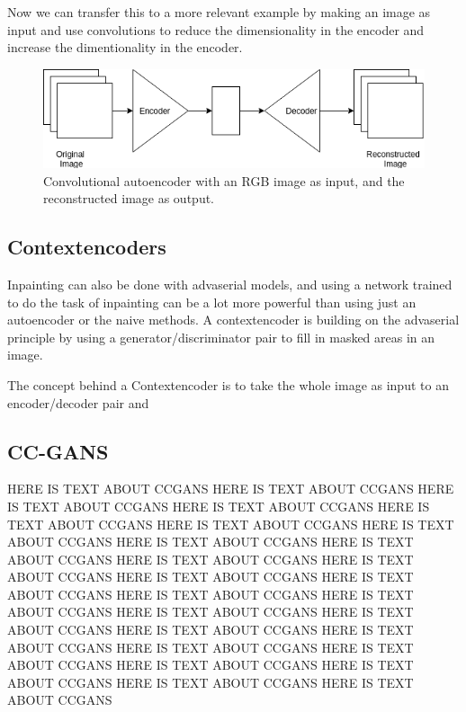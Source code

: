 	  Now we can transfer this to a more relevant example by making an image as input and use convolutions to reduce the dimensionality in the encoder and increase the dimentionality in the encoder.
	  \vspace{10px}
	  \begin{figure}[ht!]
	    \centering
	    \includegraphics[scale=0.5]{background/figures/CAE.png}
	    \caption{Convolutional autoencoder with an RGB image as input, and the reconstructed image as output.}
	  \end{figure}
	
    
    
    \subsection{Contextencoders}
	Inpainting can also be done with advaserial models, and using a network trained to do the task of inpainting can be a lot more powerful than using just an autoencoder or the naive methods.
	A contextencoder is building on the advaserial principle by using a generator/discriminator pair to fill in masked areas in an image. 
	
	The concept behind a Contextencoder is to take the whole image as input to an encoder/decoder pair and 
    
    
    \subsection{CC-GANS}
      HERE IS TEXT ABOUT CCGANS
      HERE IS TEXT ABOUT CCGANS
      HERE IS TEXT ABOUT CCGANS
      HERE IS TEXT ABOUT CCGANS
      HERE IS TEXT ABOUT CCGANS
      HERE IS TEXT ABOUT CCGANS
      HERE IS TEXT ABOUT CCGANS
      HERE IS TEXT ABOUT CCGANS
      HERE IS TEXT ABOUT CCGANS
      HERE IS TEXT ABOUT CCGANS
      HERE IS TEXT ABOUT CCGANS
      HERE IS TEXT ABOUT CCGANS
      HERE IS TEXT ABOUT CCGANS
      HERE IS TEXT ABOUT CCGANS
      HERE IS TEXT ABOUT CCGANS
      HERE IS TEXT ABOUT CCGANS
      HERE IS TEXT ABOUT CCGANS
      HERE IS TEXT ABOUT CCGANS
      HERE IS TEXT ABOUT CCGANS
      HERE IS TEXT ABOUT CCGANS
      HERE IS TEXT ABOUT CCGANS
      HERE IS TEXT ABOUT CCGANS
      HERE IS TEXT ABOUT CCGANS
      HERE IS TEXT ABOUT CCGANS
      HERE IS TEXT ABOUT CCGANS
    
